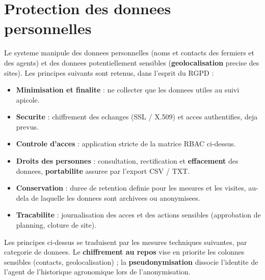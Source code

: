 \section{Protection des donnees personnelles}
Le systeme manipule des donnees personnelles (noms et contacts des fermiers et
des agents) et des donnees potentiellement sensibles (\textbf{geolocalisation}
precise des sites). Les principes suivants sont retenus, dans l'esprit du RGPD :
\begin{itemize}
  \item \textbf{Minimisation et finalite} : ne collecter que les donnees utiles au suivi apicole.
  \item \textbf{Securite} : chiffrement des echanges (SSL / X.509) et acces authentifies, deja prevus.
  \item \textbf{Controle d'acces} : application stricte de la matrice RBAC ci-dessus.
  \item \textbf{Droits des personnes} : consultation, rectification et \textbf{effacement} des donnees, \textbf{portabilite} assuree par l'export CSV / TXT.
  \item \textbf{Conservation} : duree de retention definie pour les mesures et les visites, au-dela de laquelle les donnees sont archivees ou anonymisees.
  \item \textbf{Tracabilite} : journalisation des acces et des actions sensibles (approbation de planning, cloture de site).
\end{itemize}

Les principes ci-dessus se traduisent par les mesures techniques suivantes, par
categorie de donnees. Le \textbf{chiffrement au repos} vise en priorite les
colonnes sensibles (contacts, geolocalisation) ; la \textbf{pseudonymisation}
dissocie l'identite de l'agent de l'historique agronomique lors de l'anonymisation.

